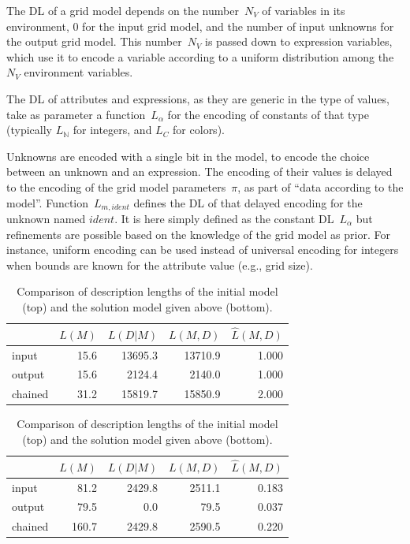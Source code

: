 \documentclass[a4paper]{llncs}
\newcommand{\nat}{\mathbb{N}}
\begin{document}
{The DL of a grid model depends on the number~$N_V$ of variables in its
environment, 0 for the input grid model, and the number of input
unknowns for the output grid model. This number~$N_V$ is passed down
to expression variables, which use it to encode a variable according to a
uniform distribution among the $N_V$ environment variables.

The DL of attributes and expressions, as they are generic in the type
of values, take as parameter a function~$L_\alpha$ for the encoding of
constants of that type (typically $L_\nat$ for integers, and $L_C$ for
colors).

Unknowns are encoded with a single bit in the model, to encode the
choice between an unknown and an expression. The encoding of their
values is delayed to the encoding of the grid model parameters~$\pi$,
as part of ``data according to the model''.  Function~$L_{m,ident}$
defines the DL of that delayed encoding for the unknown named
$ident$. It is here simply defined as the constant DL~$L_\alpha$ but
refinements are possible based on the knowledge of the grid model as
prior. For instance, uniform encoding can be used instead of universal
encoding for integers when bounds are known for the attribute value
(e.g., grid size).
}%

\begin{table}[t]
  \centering
  \caption{Comparison of description lengths of the initial model (top) and the solution model given above (bottom).}
    \begin{center}
      \begin{tabular}{|l||r|r||r|r|}
    \hline
          & $L(M)$ & $L(D|M)$ & $L(M,D)$ & $\hat{L}(M,D)$ \\
    \hline
    \hline
    input & 15.6 & 13695.3 & 13710.9 & 1.000 \\
    \hline
    output & 15.6 & 2124.4 & 2140.0 & 1.000 \\
    \hline
    \hline
    chained & 31.2 & 15819.7 & 15850.9 & 2.000 \\
    \hline
      \end{tabular}
    \end{center}
  \begin{center}
    \begin{tabular}{|l||r|r||r|r|}
    \hline
      & $L(M)$ & $L(D|M)$ & $L(M,D)$ & $\hat{L}(M,D)$ \\
    \hline
    \hline
    input & 81.2 & 2429.8 & 2511.1 & 0.183 \\
    \hline
    output & 79.5 & 0.0 & 79.5 & 0.037 \\
    \hline
    \hline
    chained & 160.7 & 2429.8 & 2590.5 & 0.220 \\
    \hline
    \end{tabular}
  \end{center}
\label{tab:dl:example}
\end{table}
\end{document}

